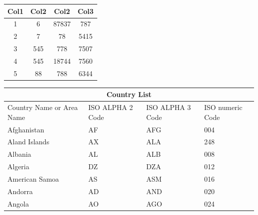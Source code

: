\documentclass{article}
\begin{document}
\begin{center}
\begin{tabular}{||c c c c||}
\hline
Col1 & Col2 & Col2 & Col3 \\[0.5ex]
\hline\hline
1 & 6 & 87837 & 787 \\
\hline
2 & 7 & 78 & 5415 \\
\hline
3 & 545 & 778 & 7507 \\
\hline
4 & 545 & 18744 & 7560 \\
\hline
5 & 88 & 788 & 6344 \\[1ex]
\hline
\end{tabular}
\end{center}

\begin{tabular}{ |p{3cm}||p{3cm}|p{3cm}|p{3cm}|  }
\hline
\multicolumn{4}{|c|}{Country List} \\
\hline
Country Name or Area Name& ISO ALPHA 2 Code &ISO ALPHA 3 Code&ISO numeric Code\\
\hline
Afghanistan   & AF    &AFG&   004\\
Aland Islands&   AX  & ALA   &248\\
Albania &AL & ALB&  008\\
Algeria    &DZ & DZA&  012\\
American Samoa&   AS  & ASM&016\\
Andorra& AD  & AND   &020\\
Angola& AO  & AGO&024\\
\hline
\end{tabular}
\end{document}
